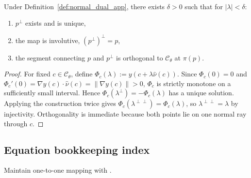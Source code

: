 \begin{theorem}
\label{thm:normal_duality_app}
Under Definition~\ref{def:normal_dual_app}, there exists \(\delta>0\) such that for
\(|\lambda|<\delta\):
\begin{enumerate}
  \item \(p^\perp\) exists and is unique,
  \item the map is involutive, \((p^\perp)^\perp=p\),
  \item the segment connecting \(p\) and \(p^\perp\) is orthogonal to
  \(\mathcal{C}_\theta\) at \(\pi(p)\).
\end{enumerate}
\end{theorem}
\begin{proof}
For fixed \(c\in\mathcal{C}_\theta\), define
\(\Phi_c(\lambda):=y(c+\lambda\hat\nu(c))\).
Since \(\Phi_c(0)=0\) and
\(\Phi_c'(0)=\nabla y(c)\cdot\hat\nu(c)=\|\nabla y(c)\|>0\),
\(\Phi_c\) is strictly monotone on a sufficiently small interval.
Hence \(\Phi_c(\lambda^\perp)=-\Phi_c(\lambda)\) has a unique solution.
Applying the construction twice gives
\(\Phi_c(\lambda^{\perp\perp})=\Phi_c(\lambda)\), so
\(\lambda^{\perp\perp}=\lambda\) by injectivity.
Orthogonality is immediate because both points lie on one normal ray through \(c\).
\end{proof}

\subsection{Equation bookkeeping index}
Maintain one-to-one mapping with
.
